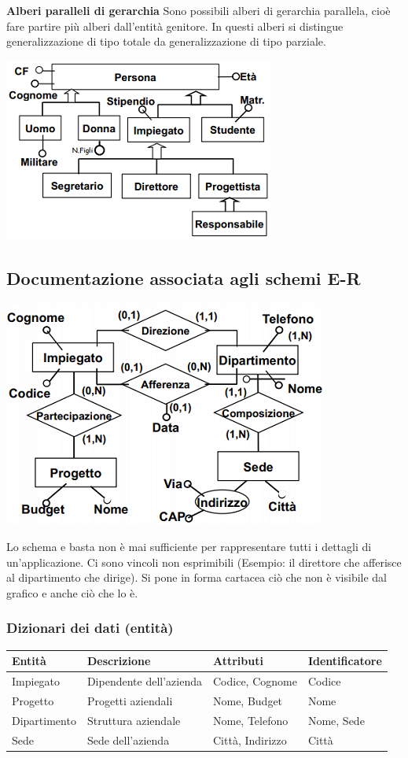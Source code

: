 \textbf{Alberi paralleli di gerarchia} Sono possibili alberi di gerarchia parallela, cioè fare partire più alberi dall'entità genitore. In questi alberi si distingue generalizzazione di tipo totale da generalizzazione di tipo parziale.
\begin{center}\includegraphics{images/22.PNG}\end{center}
\subsection{Documentazione associata agli schemi E-R}
\begin{center}\includegraphics{images/20.PNG}\end{center}
Lo schema e basta non è mai sufficiente per rappresentare tutti i dettagli di un'applicazione. Ci sono vincoli non esprimibili (Esempio: il direttore che afferisce al dipartimento che dirige). Si pone in forma cartacea ciò che non è visibile dal grafico e anche ciò che lo è.
\subsubsection*{Dizionari dei dati (entità)} 
\begin{center}
	\begin{tabular}{ |l|l|l|l| } 
		\hline
		\textbf{Entità} & \textbf{Descrizione} & \textbf{Attributi} & \textbf{Identificatore}\\
		\hline
		Impiegato & Dipendente dell'azienda & Codice, Cognome & Codice\\
		\hline
		Progetto & Progetti aziendali & Nome, Budget & Nome\\
		\hline
		Dipartimento & Struttura aziendale & Nome, Telefono & Nome, Sede\\
		\hline
		Sede & Sede dell'azienda & Città, Indirizzo & Città\\
		\hline
	\end{tabular}
\end{center}
